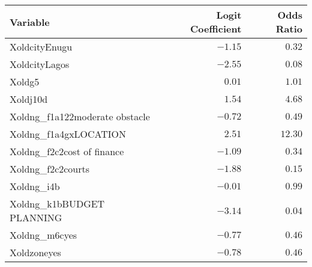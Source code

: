 \begin{longtable}{lrr}
\toprule
Variable & Logit Coefficient & Odds Ratio \\ 
\midrule
XoldcityEnugu & $-1.15$ & $0.32$ \\ 
XoldcityLagos & $-2.55$ & $0.08$ \\ 
Xoldg5 & $0.01$ & $1.01$ \\ 
Xoldj10d & $1.54$ & $4.68$ \\ 
Xoldng\_f1a122moderate obstacle & $-0.72$ & $0.49$ \\ 
Xoldng\_f1a4gxLOCATION & $2.51$ & $12.30$ \\ 
Xoldng\_f2c2cost of finance & $-1.09$ & $0.34$ \\ 
Xoldng\_f2c2courts & $-1.88$ & $0.15$ \\ 
Xoldng\_i4b & $-0.01$ & $0.99$ \\ 
Xoldng\_k1bBUDGET PLANNING & $-3.14$ & $0.04$ \\ 
Xoldng\_m6cyes & $-0.77$ & $0.46$ \\ 
Xoldzoneyes & $-0.78$ & $0.46$ \\ 
\bottomrule
\end{longtable}

